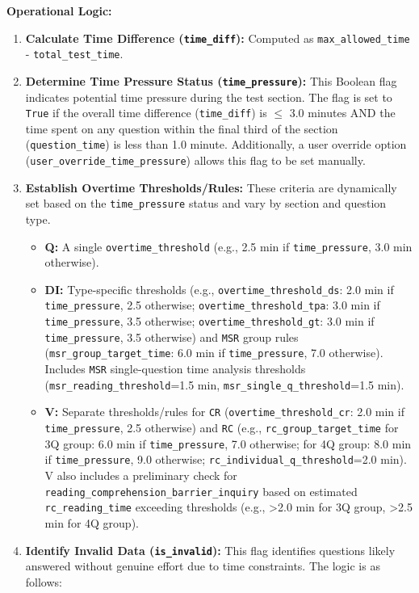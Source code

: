 \documentclass{article}
\begin{document}
\textbf{Operational Logic:}
\begin{enumerate}
    \item \textbf{Calculate Time Difference (\texttt{time\_diff}):} Computed as \texttt{max\_allowed\_time} - \texttt{total\_test\_time}.
 \item \textbf{Determine Time Pressure Status (\texttt{time\_pressure}):} This Boolean flag indicates potential time pressure during the test section. The flag is set to \texttt{True} if the overall time difference (\texttt{time\_diff}) is $\leq$ 3.0 minutes AND the time spent on any question within the final third of the section (\texttt{question\_time}) is less than 1.0 minute. Additionally, a user override option (\texttt{user\_override\_time\_pressure}) allows this flag to be set manually.
    \item \textbf{Establish Overtime Thresholds/Rules:} These criteria are dynamically set based on the \texttt{time\_pressure} status and vary by section and question type.
    \begin{itemize}
        \item \textbf{Q:} A single \texttt{overtime\_threshold} (e.g., 2.5 min if \texttt{time\_pressure}, 3.0 min otherwise).
        \item \textbf{DI:} Type-specific thresholds (e.g., \texttt{overtime\_threshold\_ds}: 2.0 min if \texttt{time\_pressure}, 2.5 otherwise; \texttt{overtime\_threshold\_tpa}: 3.0 min if \texttt{time\_pressure}, 3.5 otherwise; \texttt{overtime\_threshold\_gt}: 3.0 min if \texttt{time\_pressure}, 3.5 otherwise) and \texttt{MSR} group rules (\texttt{msr\_group\_target\_time}: 6.0 min if \texttt{time\_pressure}, 7.0 otherwise). Includes \texttt{MSR} single-question time analysis thresholds (\texttt{msr\_reading\_threshold}=1.5 min, \texttt{msr\_single\_q\_threshold}=1.5 min).
        \item \textbf{V:} Separate thresholds/rules for \texttt{CR} (\texttt{overtime\_threshold\_cr}: 2.0 min if \texttt{time\_pressure}, 2.5 otherwise) and \texttt{RC} (e.g., \texttt{rc\_group\_target\_time} for 3Q group: 6.0 min if \texttt{time\_pressure}, 7.0 otherwise; for 4Q group: 8.0 min if \texttt{time\_pressure}, 9.0 otherwise; \texttt{rc\_individual\_q\_threshold}=2.0 min). V also includes a preliminary check for \texttt{reading\_comprehension\_barrier\_inquiry} based on estimated \texttt{rc\_reading\_time} exceeding thresholds (e.g., >2.0 min for 3Q group, >2.5 min for 4Q group).
    \end{itemize}
    \item \textbf{Identify Invalid Data (\texttt{is\_invalid}):} This flag identifies questions likely answered without genuine effort due to time constraints. The logic is as follows:

\end{enumerate}
\end{document}
